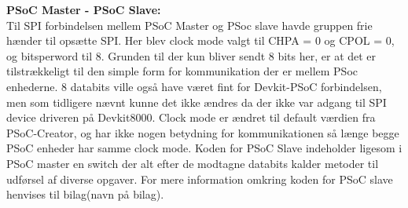 \textbf{PSoC Master - PSoC Slave:} \\

Til SPI forbindelsen mellem PSoC Master og PSoc slave havde gruppen frie hænder til opsætte SPI. Her blev clock mode valgt til CHPA = 0 og CPOL = 0, og 
bitsperword til 8. Grunden til der kun bliver sendt 8 bits her, er at det er tilstrækkeligt til den simple form for kommunikation der er mellem PSoc enhederne.
8 databits ville også have været fint for Devkit-PSoC forbindelsen, men som tidligere nævnt kunne det ikke ændres da der ikke var adgang til SPI device driveren
på Devkit8000. Clock mode er ændret til default værdien fra PSoC-Creator, og har ikke nogen betydning for kommunikationen så længe begge PSoC enheder har samme
clock mode. Koden for PSoC Slave indeholder ligesom i PSoC master en switch der alt efter de modtagne databits kalder metoder til udførsel af diverse opgaver. 
For mere information omkring koden for PSoC slave henvises til bilag(navn på bilag).   


